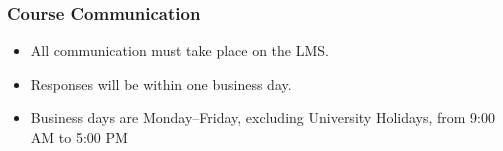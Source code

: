\begin{frame}
  \frametitle{Course Communication}

  \begin{itemize}
  \item All communication \alert{must} take place on the LMS.
  \item Responses will be within one business day.
  \item Business days are Monday--Friday, excluding University Holidays, from 9:00 AM to 5:00 PM
  \end{itemize}
  
\end{frame}
